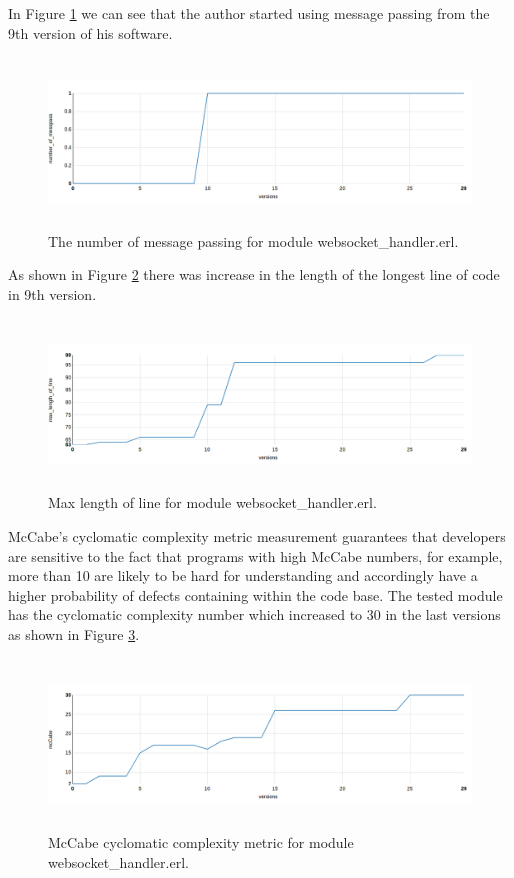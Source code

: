 In Figure \ref{fig:chat} we can see that the author started using message passing from the 9th version of his software.

\begin{figure}[h]
	\centering
	\includegraphics[height=45mm]{figures/chat.png}
	\caption{The number of message passing for module websocket\_handler.erl.}
	\label{fig:chat}
\end{figure}

As shown in Figure \ref{fig:chat5} there was increase in the length of the longest line of code in 9th version. 
\begin{figure}[h]
	\centering
	\includegraphics[height=45mm]{figures/chat5.png}
	\caption{Max length of line for module websocket\_handler.erl.}
	\label{fig:chat5}
\end{figure}

McCabe’s cyclomatic complexity metric measurement guarantees that developers are sensitive to the fact that programs with high McCabe numbers, for example, more than 10 are likely to be hard for understanding and accordingly have a higher probability of defects containing within the code base. The tested module has the cyclomatic complexity number which increased to 30 in the last versions as shown in Figure \ref{fig:mcCabe}.

\begin{figure}[h]
	\centering
	\includegraphics[height=45mm]{figures/mcCabe.png}
	\caption{
	McCabe cyclomatic complexity metric for module websocket\_handler.erl.}
	\label{fig:mcCabe}
\end{figure}

